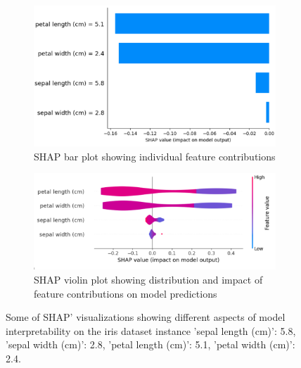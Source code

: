 \begin{figure}[htbp]
    \begin{subfigure}[c]{0.385\textwidth}
        \centering
        \includegraphics[width=\textwidth]{images/shapBarPlot.png}
        \caption{SHAP bar plot showing individual feature contributions}
        \label{fig:shap_bar}
    \end{subfigure}
    \hfill
    \begin{subfigure}[c]{0.385\textwidth}
        \centering
        \includegraphics[width=\textwidth]{images/shapViolinPlot.png}
        \caption{SHAP violin plot showing distribution and impact of feature contributions on model predictions}
        \label{fig:shap_violin}
    \end{subfigure}
    
    \caption{Some of SHAP' visualizations showing different aspects of model interpretability on the iris dataset instance 'sepal length (cm)': 5.8, 'sepal width (cm)': 2.8, 'petal length (cm)': 5.1, 'petal width (cm)': 2.4.}
    \label{fig:shapAllViz}
\end{figure}


